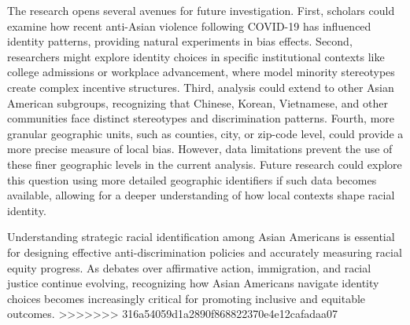 The research opens several avenues for future investigation. First, scholars could examine how recent anti-Asian violence following COVID-19 has influenced identity patterns, providing natural experiments in bias effects. Second, researchers might explore identity choices in specific institutional contexts like college admissions or workplace advancement, where model minority stereotypes create complex incentive structures. Third, analysis could extend to other Asian American subgroups, recognizing that Chinese, Korean, Vietnamese, and other communities face distinct stereotypes and discrimination patterns. Fourth, more granular geographic units, such as counties, city, or zip-code level, could provide a more precise measure of local bias. However, data limitations prevent the use of these finer geographic levels in the current analysis. Future research could explore this question using more detailed geographic identifiers if such data becomes available, allowing for a deeper understanding of how local contexts shape racial identity.

Understanding strategic racial identification among Asian Americans is essential for designing effective anti-discrimination policies and accurately measuring racial equity progress. As debates over affirmative action, immigration, and racial justice continue evolving, recognizing how Asian Americans navigate identity choices becomes increasingly critical for promoting inclusive and equitable outcomes.
>>>>>>> 316a54059d1a2890f868822370e4e12cafadaa07
